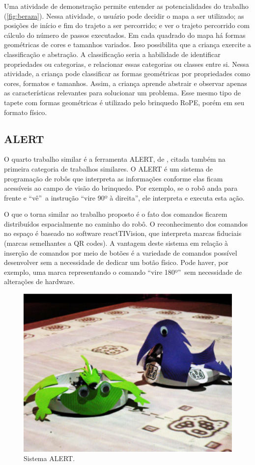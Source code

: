 Uma atividade de demonstração permite entender as potencialidades do trabalho (\autoref{fig:beraza}). Nessa atividade, o usuário pode decidir o mapa a ser utilizado; as posições de início e fim do trajeto a ser percorrido; e ver o trajeto percorrido com cálculo do número de passos executados. Em cada quadrado do mapa há formas geométricas de cores e tamanhos variados. Isso possibilita que a criança exercite a classificação e abstração. A classificação seria a habilidade de identificar propriedades ou categorias, e relacionar essas categorias ou classes entre si. Nessa atividade, a criança pode classificar as formas geométricas por propriedades como cores, formatos e tamanhos. Assim, a criança aprende abstrair e observar apenas as características relevantes para solucionar um problema. Esse mesmo tipo de tapete com formas geométricas é utilizado pelo brinquedo RoPE, porém em seu formato físico.

\subsection{ALERT}

O quarto trabalho similar é a ferramenta ALERT, de \cite{burleson_active_2018}, citada também na primeira categoria de trabalhos similares. O ALERT é um sistema de programação de robôs que interpreta as informações conforme elas ficam acessíveis ao campo de visão do brinquedo. Por exemplo, se o robô anda para frente e “vê”\ a instrução “vire 90º à direita”, ele interpreta e executa esta ação.

O que o torna similar ao trabalho proposto é o fato dos comandos ficarem distribuídos espacialmente no caminho do robô. O reconhecimento dos comandos no espaço é baseado no software reactTIVision, que interpreta marcas fiduciais (marcas semelhantes a QR codes). A vantagem deste sistema em relação à inserção de comandos por meio de botões é a variedade de comandos possível desenvolver sem a necessidade de dedicar um botão físico. Pode haver, por exemplo, uma marca representando o comando “vire 180º”\ sem necessidade de alterações de hardware.

\begin{figure}[!htbp]
    \centering
    \includegraphics[width=.7\linewidth,fbox]{figs/alert.png}
    \caption{Sistema ALERT.}
    \label{fig:alert}
\end{figure}

